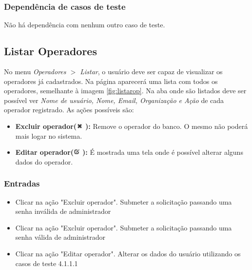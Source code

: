\subsubsection{Dependência de casos de teste}
Não há dependência com nenhum outro caso de teste.

\subsection{Listar Operadores}

No menu \textit{Operadores $>$ Listar}, o usuário deve ser capaz de visualizar os operadores já cadastrados.
Na página aparecerá uma lista com todos os operadores, semelhante à imagem \ref{fig:listarop}.
Na aba onde são listados deve ser possível ver \textit{Nome de usuário, Nome, Email, Organização e Ação} de cada operador registrado. As ações possíveis são:

\begin{itemize}

	\item \textbf{Excluir operador(}\includegraphics[height=10pt]{images/iconedelete2} \textbf{):} Remove o operador do banco. O mesmo não poderá mais logar no sistema.
	\item \textbf{Editar operador(}\includegraphics[height=10pt]{images/iconeeditar} \textbf{):} É mostrada uma tela onde é possível alterar alguns dados do operador.
	
\end{itemize}

\subsubsection{Entradas}

\begin{itemize}

	\item Clicar na ação "Excluir operador". Submeter a solicitação passando uma senha inválida de administrador
	\item Clicar na ação "Excluir operador". Submeter a solicitação passando uma senha válida de administrador
	\item Clicar na ação "Editar operador". Alterar os dados do usuário utilizando os casos de teste 4.1.1.1
	
\end{itemize}

